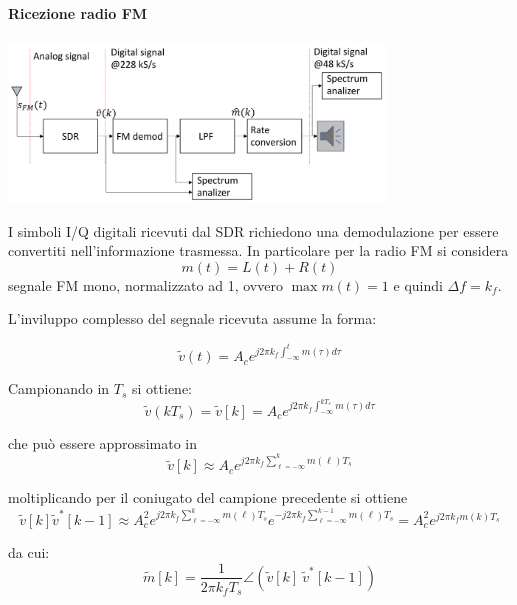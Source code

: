 \paragraph*{Ricezione radio FM}
\begin{center}
    \includegraphics[width=0.75\textwidth]{imgs/fm_receiver_impl.jpg}
\end{center}
I simboli I/Q digitali ricevuti dal SDR richiedono una demodulazione per essere convertiti nell'informazione trasmessa. In particolare per la radio FM si considera
\[
    m(t) = L(t) + R(t)
\]
segnale FM mono, normalizzato ad 1, ovvero $\max{m(t)} = 1$ e quindi $\Delta f = k_f$.


L'inviluppo complesso del segnale ricevuta assume la forma:

\[
    \tilde{v}(t) = A_c e^{j2\pi k_f \int_{-\infty}^{t} m(\tau) d\tau}
\]

Campionando in $T_s$ si ottiene:
\[
    \tilde{v}(kT_s) = \tilde{v}[k] = A_c e^{j2\pi k_f \int_{-\infty}^{kT_s} m(\tau) d\tau}
\]

che può essere approssimato in
\[
    \tilde{v}[k] \approx A_c e^{j2\pi k_f \sum_{\ell = -\infty}^{k} m(\ell) T_s}
\]

moltiplicando per il coniugato del campione precedente si ottiene
\[
  \tilde{v}[k] \tilde{v}^*[k-1] \approx A_c^2 e^{j2\pi k_f \sum_{\ell = -\infty}^{k} m(\ell) T_s} e^{-j2\pi k_f \sum_{\ell = -\infty}^{k-1} m(\ell) T_s} = A_c^2 e^{j2\pi k_f m(k) T_s}
\]


da cui:
\[
    \tilde{m}[k] = \frac{1}{2\pi k_f T_s} \angle \left( \tilde{v}[k] \ \tilde{v}^*[k-1] \right)
\]

